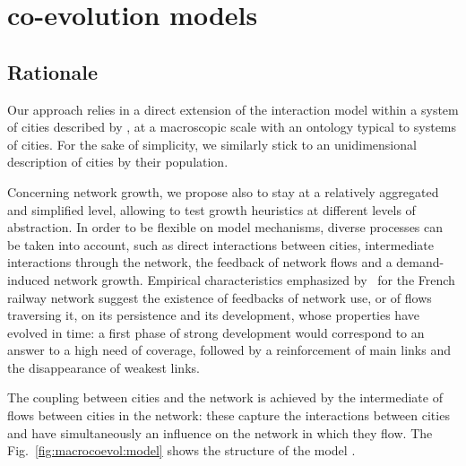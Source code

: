 

\section{ co-evolution models}



\subsection{Rationale}

Our approach relies in a direct extension of the interaction model within a system of cities described by \cite{raimbault2018indirect}, at a macroscopic scale with an ontology typical to systems of cities. For the sake of simplicity, we similarly stick to an unidimensional description of cities by their population.


Concerning network growth, we propose also to stay at a relatively aggregated and simplified level, allowing to test growth heuristics at different levels of abstraction. In order to be flexible on model mechanisms, diverse processes can be taken into account, such as direct interactions between cities, intermediate interactions through the network, the feedback of network flows and a demand-induced network growth. Empirical characteristics emphasized by~\cite{thevenin2013mapping} for the French railway network suggest the existence of feedbacks of network use, or of flows traversing it, on its persistence and its development, whose properties have evolved in time: a first phase of strong development would correspond to an answer to a high need of coverage, followed by a reinforcement of main links and the disappearance of weakest links.


The coupling between cities and the network is achieved by the intermediate of flows between cities in the network: these capture the interactions between cities and have simultaneously an influence on the network in which they flow. The Fig.~\ref{fig:macrocoevol:model} shows the structure of the model .


